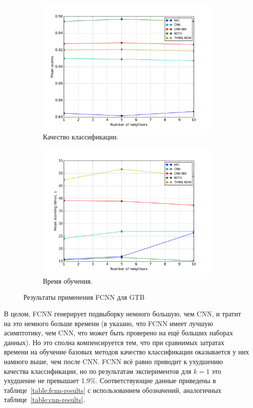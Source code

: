 \begin{figure}
	\centering
	\begin{subfigure}{0.45\textwidth}
		\includegraphics[width=\textwidth]{images/fcnn-gradboosting.png}
		\caption{Качество классификации.}
	\end{subfigure}
	\begin{subfigure}{0.45\textwidth}
		\includegraphics[width=\textwidth]{images/fcnn-gradboostingTime.png}
		\caption{Время обучения.}
	\end{subfigure}
	\caption{Результаты применения FCNN для GTB}\label{fig:fcnn-gtb-results}
\end{figure}

В целом, FCNN генерирует подвыборку немного большую, чем CNN, и тратит на это немного больше времени (в \cite{angiulli} указано, что FCNN имеет лучшую асимптотику, чем CNN, что может быть проверено на ещё больших наборах данных). Но это сполна компенсируется тем, что при сравнимых затратах времени на обучение базовых методов качество классификации оказывается у них намного выше, чем после CNN. FCNN всё равно приводит к ухудшению качества классификации, но по результатам экспериментов для \(k=1\) это ухудшение не превышает 1.9\%. Соответствующие данные приведены в таблице~\ref{table:fcnn-results} с использованием обозначений, аналогичных таблице~\ref{table:cnn-results}.

